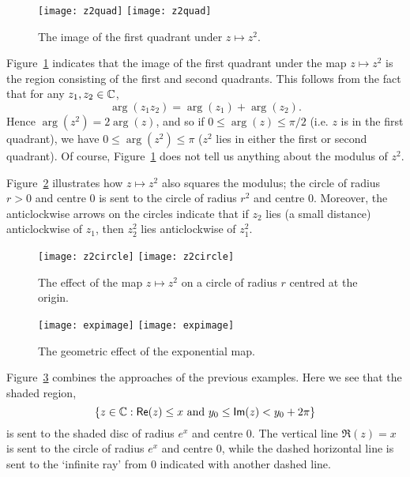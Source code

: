 \begin{figure}[h]
\centering
{\texttt{[image: z2quad]}}
{\texttt{[image: z2quad]}}
\caption{The image of the first quadrant under $z \mapsto z^2$.}
\label{f:z2}
\end{figure}
Figure~\ref{f:z2} indicates that the image of the first quadrant under the map $z \mapsto z^2$ is the region consisting of the first and second quadrants.  This follows from the fact that for any $z_1,z_2 \in \mathbb{C}$, 
\[
\arg (z_1z_2)=\arg(z_1)+\arg(z_2).
\]
Hence $\arg(z^2)=2\arg(z)$, and so if $0 \leq \arg (z) \leq \pi/2$ (i.e. $z$ is in the first quadrant), we have $0 \leq \arg (z^2) \leq \pi$ ($z^2$ lies in either the first or second quadrant).  Of course, Figure~\ref{f:z2} does not tell us anything about the modulus of $z^2$.


Figure~\ref{f:z2c} illustrates how $z \mapsto z^2$ also squares the modulus; the circle of radius $r>0$ and centre $0$ is sent to the circle of radius $r^2$ and centre $0$.  Moreover, the anticlockwise arrows on the circles indicate that if $z_2$ lies (a small distance) anticlockwise of $z_1$, then $z_2^2$ lies anticlockwise of $z_1^2$.





\begin{figure}[h]
\centering
{\texttt{[image: z2circle]}}
{\texttt{[image: z2circle]}}
\caption{The effect of the map $z \mapsto z^2$ on a circle of radius $r$ centred at the origin.}
\label{f:z2c}
\end{figure}


\begin{figure}[h]
\centering
{\texttt{[image: expimage]}}
{\texttt{[image: expimage]}}
\caption{The geometric effect of the exponential map.}
\label{f:exp}
\end{figure}

Figure~\ref{f:exp} combines the approaches of the previous examples.  Here we see that the shaded region,
\[
\left\{z \in \mathbb{C}: \textsf{Re} (z) \leq x \text{ and } y_0 \leq \textsf{Im} (z) < y_0+2\pi\right\}
\]
is sent to the shaded disc of radius $e^x$ and centre $0$.  The vertical line $\Re(z)=x$ is sent to the circle of radius $e^x$ and centre $0$, while the dashed horizontal line is sent to the `infinite ray' from $0$ indicated with another dashed line.


